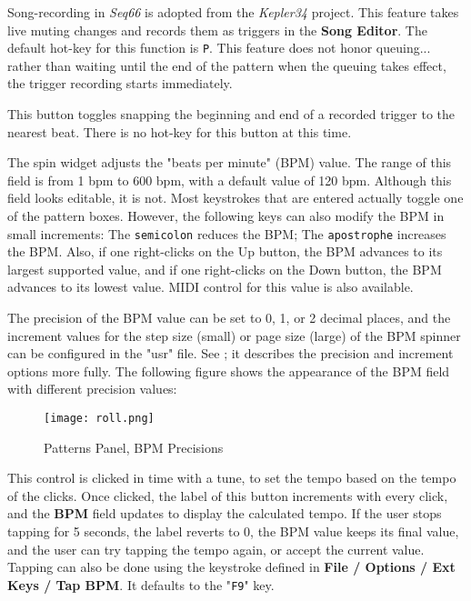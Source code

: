    Song-recording in \textsl{Seq66} is adopted from the
   \textsl{Kepler34} project.
   This feature takes live muting changes and records them as
   triggers in the \textbf{Song Editor}.
   The default hot-key for this function is \texttt{P}.
   This feature does not honor queuing...
   rather than waiting until the end of the pattern when the queuing takes
   effect, the trigger recording starts immediately.

   This button toggles snapping the beginning and end of a recorded trigger to
   the nearest beat.  There is no hot-key for this button at this time.

   The spin widget adjusts the "beats per minute" (BPM) value.  The
   range of this field is from 1 bpm to 600 bpm, with a default value of
   120 bpm.
   Although this field looks editable, it is not.  Most keystrokes
   that are entered actually toggle one of the pattern boxes.
   However, the following keys can also modify the BPM in small increments:
   The \texttt{semicolon} reduces the BPM;
   The \texttt{apostrophe} increases the BPM.
   Also, if one right-clicks on the Up button, the BPM advances to its largest
   supported value, and if one right-clicks on the Down button, the BPM
   advances to its lowest value.
   MIDI control for this value is also available.

   The precision of the BPM value can be set to 0, 1, or 2
   decimal places, and the increment values for the step size (small)
   or page size (large) of the BPM spinner can be configured in the "usr" file.
   See ; it describes
   the precision and increment options more fully.
   The following figure shows the appearance of the BPM field with different
   precision values:

\begin{figure}[H]
   \centering 
   \texttt{[image: roll.png]}
   \caption{Patterns Panel, BPM Precisions}
   \label{fig:pattern_window_bpm_precision_settings.png}
\end{figure}

   This control is clicked in time with a tune, to set the
   tempo based on the tempo of the clicks.  Once clicked, the label of this
   button increments with every click, and the \textbf{BPM} field updates to
   display the calculated tempo.  If the user stops tapping for 5 seconds, the
   label reverts to 0, the BPM value keeps its final value, and the user can
   try tapping the tempo again, or accept the current value.
   Tapping can also be done using the keystroke defined
   in \textbf{File / Options / Ext Keys / Tap BPM}.
   It defaults to the "\texttt{F9}" key.

